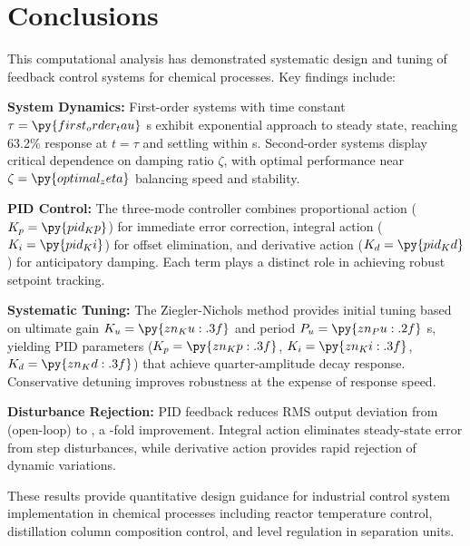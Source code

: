 \documentclass[11pt,a4paper]{article}
\begin{document}
\section{Conclusions}

This computational analysis has demonstrated systematic design and tuning of feedback control systems for chemical processes. Key findings include:

\textbf{System Dynamics:} First-order systems with time constant $\tau = \py{first_order_tau}$ s exhibit exponential approach to steady state, reaching 63.2\% response at $t = \tau$ and settling within  s. Second-order systems display critical dependence on damping ratio $\zeta$, with optimal performance near $\zeta = \py{optimal_zeta}$ balancing speed and stability.

\textbf{PID Control:} The three-mode controller combines proportional action ($K_p = \py{pid_Kp}$) for immediate error correction, integral action ($K_i = \py{pid_Ki}$) for offset elimination, and derivative action ($K_d = \py{pid_Kd}$) for anticipatory damping. Each term plays a distinct role in achieving robust setpoint tracking.

\textbf{Systematic Tuning:} The Ziegler-Nichols method provides initial tuning based on ultimate gain $K_u = \py{zn_Ku:.3f}$ and period $P_u = \py{zn_Pu:.2f}$ s, yielding PID parameters ($K_p = \py{zn_Kp:.3f}$, $K_i = \py{zn_Ki:.3f}$, $K_d = \py{zn_Kd:.3f}$) that achieve quarter-amplitude decay response. Conservative detuning improves robustness at the expense of response speed.

\textbf{Disturbance Rejection:} PID feedback reduces RMS output deviation from  (open-loop) to , a -fold improvement. Integral action eliminates steady-state error from step disturbances, while derivative action provides rapid rejection of dynamic variations.

These results provide quantitative design guidance for industrial control system implementation in chemical processes including reactor temperature control, distillation column composition control, and level regulation in separation units.
\end{document}
